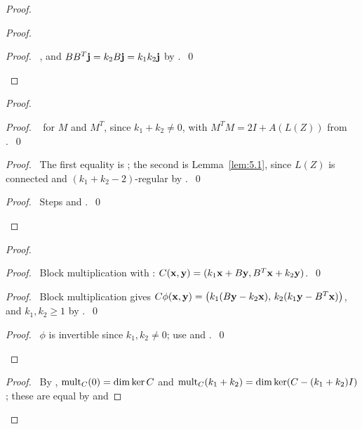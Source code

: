 \begin{proof}
\begin{proof}
  \qedstep
  \begin{proof}\pf\ , and $BB^T{\mathbf j}=k_2B{\mathbf j}=k_1k_2{\mathbf j}$ by
   .~\qed\end{proof}
 \end{proof}
 \begin{proof}
  \begin{proof}\pf\  for $M$ and $M^T$, since $k_1+k_2\ne0$, with
   $M^TM=2I+A(L(Z))$ from .~\qed\end{proof}
  \begin{proof}\pf\ The first equality is ; the second is Lemma~\ref{lem:5.1},
   since $L(Z)$ is connected and $(k_1+k_2-2)$-regular by .~\qed\end{proof}
  \qedstep
  \begin{proof}\pf\ Steps  and .~\qed\end{proof}
 \end{proof}
 \begin{proof}
  \begin{proof}\pf\ Block multiplication with : $C({\mathbf x},{\mathbf y})=(k_1{\mathbf x}+B{\mathbf y},
   B^T{\mathbf x}+k_2{\mathbf y})$.~\qed\end{proof}
  \begin{proof}\pf\ Block multiplication gives
   $C\phi({\mathbf x},{\mathbf y})=\bigl(k_1(B{\mathbf y}-k_2{\mathbf x}),\,k_2(k_1{\mathbf y}-B^T{\mathbf x})\bigr)$, and $k_1,k_2\ge1$ by
   .~\qed\end{proof}
  \qedstep
  \begin{proof}\pf\ $\phi$ is invertible since $k_1,k_2\ne0$; use  and
   .~\qed\end{proof}
 \end{proof}
 \begin{proof}\pf\ By , $\mathop{\mathrm{mult}}\nolimits_C(0)=\dim\ker C$ and
  $\mathop{\mathrm{mult}}\nolimits_C(k_1+k_2)=\dim\ker(C-(k_1+k_2)I)$; these are equal by  and

\end{proof}
\end{proof}
